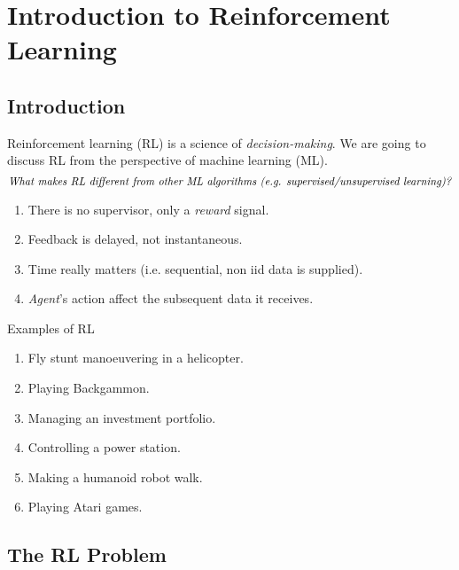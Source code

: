 \documentclass[RL]{subfile}
\begin{document}
    \section{Introduction to Reinforcement Learning}

    \subsection{Introduction}

    Reinforcement learning (RL) is a science of \textit{decision-making}. We are going to discuss RL from the perspective of machine learning (ML).
    \begin{equation}
        \text{\textit{What makes RL different from other ML algorithms (e.g. supervised/unsupervised learning)?}}
    \end{equation}
    \begin{enumerate}
        \item There is no supervisor, only a \textit{reward} signal.
        \item Feedback is delayed, not instantaneous.
        \item Time really matters (i.e. sequential, non iid data is supplied).
        \item \textit{Agent}'s action affect the subsequent data it receives.
    \end{enumerate}
    
    \begin{example}{Examples of RL}
        \vspace{-11pt}
        \begin{enumerate}
            \item Fly stunt manoeuvering in a helicopter.
            \item Playing Backgammon.
            \item Managing an investment portfolio.
            \item Controlling a power station.
            \item Making a humanoid robot walk.
            \item Playing Atari games.
        \end{enumerate}
    \end{example}

    \rruleline

    \subsection{The RL Problem}
    
\end{document}
